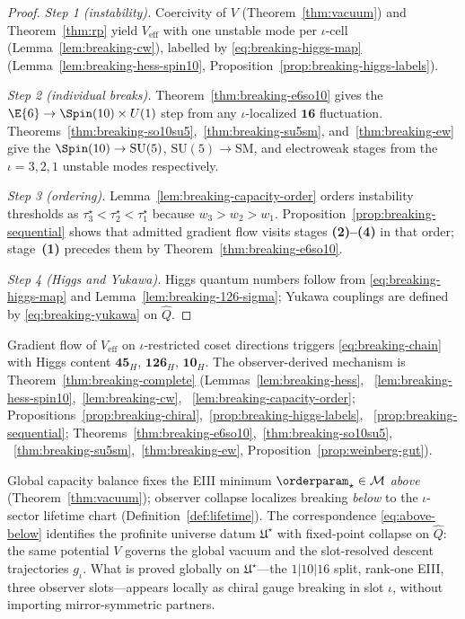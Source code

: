 \begin{proof}
\emph{Step 1 (instability).} Coercivity of $V$ (Theorem~\ref{thm:vacuum})
and Theorem~\ref{thm:rp} yield $V_{\mathrm{eff}}$ with one unstable mode per
$\iota$-cell (Lemma~\ref{lem:breaking-cw}), labelled by
\eqref{eq:breaking-higgs-map} (Lemma~\ref{lem:breaking-hess-spin10},
Proposition~\ref{prop:breaking-higgs-labels}).

\emph{Step 2 (individual breaks).} Theorem~\ref{thm:breaking-e6so10} gives
the $\E{6}\to\Spin(10)\times U(1)$ step from any $\iota$-localized $\mathbf{16}$
fluctuation. Theorems~\ref{thm:breaking-so10su5},~\ref{thm:breaking-su5sm},
and~\ref{thm:breaking-ew} give the $\Spin(10)\to\mathrm{SU}(5)$,
$\mathrm{SU}(5)\to$SM, and electroweak stages from the $\iota=3,2,1$ unstable
modes respectively.

\emph{Step 3 (ordering).} Lemma~\ref{lem:breaking-capacity-order} orders
instability thresholds as $\tau_3^\star<\tau_2^\star<\tau_1^\star$ because
$w_3>w_2>w_1$. Proposition~\ref{prop:breaking-sequential} shows that admitted
gradient flow visits stages \textbf{(2)--(4)} in that order; stage~\textbf{(1)}
precedes them by Theorem~\ref{thm:breaking-e6so10}.

\emph{Step 4 (Higgs and Yukawa).} Higgs quantum numbers follow from
\eqref{eq:breaking-higgs-map} and Lemma~\ref{lem:breaking-126-sigma}; Yukawa
couplings are defined by \eqref{eq:breaking-yukawa} on $\hat Q$.
\end{proof}

\begin{corollary}\label{cor:breaking}
Gradient flow of $V_{\mathrm{eff}}$ on $\iota$-restricted coset directions
triggers \eqref{eq:breaking-chain} with Higgs content $\mathbf{45}_H$,
$\mathbf{126}_H$, $\mathbf{10}_H$. The observer-derived mechanism is
Theorem~\ref{thm:breaking-complete} (Lemmas~\ref{lem:breaking-hess},
~\ref{lem:breaking-hess-spin10},~\ref{lem:breaking-cw},
~\ref{lem:breaking-capacity-order};
Propositions~\ref{prop:breaking-chiral},~\ref{prop:breaking-higgs-labels},
~\ref{prop:breaking-sequential};
Theorems~\ref{thm:breaking-e6so10},~\ref{thm:breaking-so10su5},
~\ref{thm:breaking-su5sm},~\ref{thm:breaking-ew},
Proposition~\ref{prop:weinberg-gut}).
\end{corollary}

\begin{remark}\label{rem:breaking-above-below}
Global capacity balance fixes the EIII minimum $\orderparam_\star\in\mathcal{M}$
\emph{above} (Theorem~\ref{thm:vacuum}); observer collapse localizes breaking
\emph{below} to the $\iota$-sector lifetime chart
(Definition~\ref{def:lifetime}). The correspondence \eqref{eq:above-below}
identifies the profinite universe datum $\mathfrak{U}^\star$ with fixed-point
collapse on $\hat Q$: the same potential $V$ governs the global vacuum and the
slot-resolved descent trajectories $g_\iota$. What is proved globally on
$\mathfrak{U}^\star$---the $1|10|16$ split, rank-one EIII, three observer
slots---appears locally as chiral gauge breaking in slot $\iota$, without
importing mirror-symmetric partners.
\end{remark}

